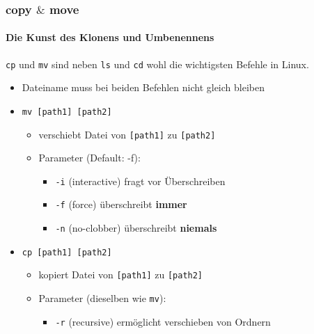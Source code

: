 \documentclass[12pt,utf8]{beamer}
\begin{document}

\begin{frame}
\frametitle{copy $\&$ move}
\framesubtitle{Die Kunst des Klonens und Umbenennens}
\texttt{cp} und \texttt{mv} sind neben \texttt{ls} und \texttt{cd} wohl die wichtigsten Befehle in Linux.
\begin{itemize}
	\item Dateiname muss bei beiden Befehlen nicht gleich bleiben
	\item \texttt{mv [path1] [path2]}
	\begin{itemize}
		\item verschiebt Datei von \texttt{[path1]} zu \texttt{[path2]}
		\item Parameter (Default: -f):
		\begin{itemize}[<+->]
			\item {\scriptsize \texttt{-i} (interactive) fragt vor Überschreiben}
			\item {\scriptsize \texttt{-f} (force) überschreibt \textbf{immer}}
			\item {\scriptsize \texttt{-n} (no-clobber) überschreibt \textbf{niemals}}
		\end{itemize}
	\end{itemize}
	\item \texttt{cp [path1] [path2]}
	\begin{itemize}
		\item kopiert Datei von \texttt{[path1]} zu \texttt{[path2]}
		\item Parameter {\scriptsize (dieselben wie \texttt{mv})}:
		\begin{itemize}[<+->]
			\item {\scriptsize \texttt{-r} (recursive) ermöglicht verschieben von Ordnern}
		\end{itemize}
	\end{itemize}
\end{itemize}
\end{frame}
\end{document}
